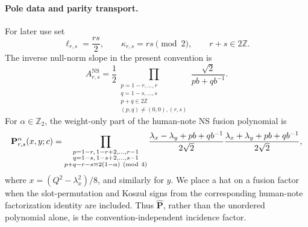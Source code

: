 \documentclass[11pt]{article}
\newcommand{\NS}{\mathrm{NS}}
\begin{document}
\paragraph{Pole data and parity transport.}
For later use set
\begin{equation}
 \ell_{r,s}=\frac{rs}{2},\qquad
 \kappa_{r,s}=rs\pmod2,\qquad r+s\in2\mathbb Z.
 \label{eq:ns-sphere-linear-null-data}
\end{equation}
The inverse null-norm slope in the present convention is
\begin{equation}
 A^{\NS}_{r,s}
 =
 \frac12
 \prod_{\substack{
 p=1-r,\ldots,r\\ q=1-s,\ldots,s\\
 p+q\in2\mathbb Z\\
 (p,q)\neq(0,0),(r,s)}}
 \frac{\sqrt2}{pb+qb^{-1}}.
 \label{eq:ns-sphere-linear-a-factor}
\end{equation}
For \(\alpha\in\mathbb Z_2\), the weight-only part of the human-note NS
fusion polynomial is
\begin{equation}
 \mathbf P^\alpha_{r,s}(x,y;c)
 =
 \prod_{\substack{
 p=1-r,\,1-r+2,\ldots,r-1\\
 q=1-s,\,1-s+2,\ldots,s-1\\
 p+q-r-s\equiv2(1-\alpha)\ ({\rm mod}\ 4)}}
 \frac{\lambda_x-\lambda_y+pb+qb^{-1}}{2\sqrt2}
 \frac{\lambda_x+\lambda_y+pb+qb^{-1}}{2\sqrt2},
 \label{eq:ns-sphere-linear-fusion-polynomial}
\end{equation}
where \(x=(Q^2-\lambda_x^2)/8\), and similarly for \(y\).
We place a hat on a fusion factor when the slot-permutation and Koszul signs
from the corresponding human-note factorization identity are included.
Thus \(\widehat{\mathbf P}\), rather than the unordered polynomial alone,
is the convention-independent incidence factor.
\end{document}
